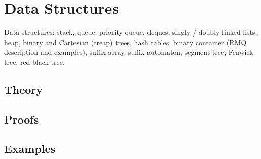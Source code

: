 
\section{Data Structures}
\label{sec:2.3b.01-data-structures}

\begin{ticket}
Data structures: stack, queue, priority queue, deques, singly / doubly linked lists, heap, binary and Cartesian (treap) trees, hash tables, binary container (RMQ description and examples), suffix array, suffix automaton, segment tree, Fenwick tree, red-black tree.
\end{ticket}

\subsection*{Theory}

\subsection*{Proofs}

\subsection*{Examples}
